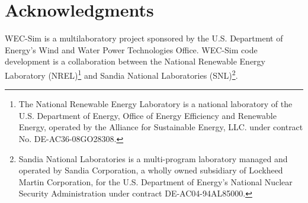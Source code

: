\chapter*{Acknowledgments}

WEC-Sim is a multilaboratory project sponsored by the U.S. Department of Energy's Wind and Water Power Technologies Office.  WEC-Sim code development is a collaboration between the National Renewable Energy Laboratory (NREL)\footnote{The National Renewable Energy Laboratory is a national laboratory of the U.S. Department of Energy, Office of Energy Efficiency and Renewable Energy, operated by the Alliance for Sustainable Energy, LLC. under contract No. DE-AC36-08GO28308.} and Sandia National Laboratories (SNL)\footnote{Sandia National Laboratories is a multi-program laboratory managed and operated by Sandia Corporation, a wholly owned subsidiary of Lockheed Martin Corporation, for the U.S. Department of Energy’s National Nuclear Security Administration under contract DE-AC04-94AL85000. }.\\

